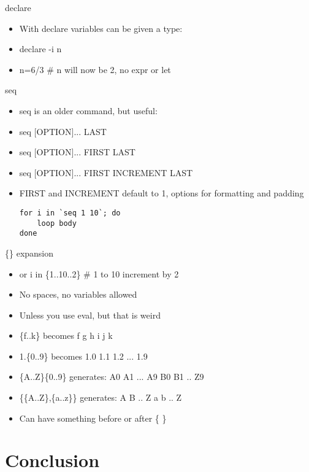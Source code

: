 \documentclass{beamer}
\begin{document}
\begin{frame}{declare}
\begin{itemize}
\item With declare variables can be given a type: \\
\item declare -i n \\
\item n=6/3 \# n will now be 2, no expr or let \\
\end{itemize}
\end{frame}

\begin{frame}[fragile]{seq}
\begin{itemize}
\item seq is an older command, but useful:
\item seq $[$OPTION$]$... LAST
\item seq $[$OPTION$]$... FIRST LAST
\item seq $[$OPTION$]$... FIRST INCREMENT LAST
\item FIRST and INCREMENT default to 1, options for formatting and padding
\begin{lstlisting}
for i in `seq 1 10`; do
    loop body
done
\end{lstlisting}
\end{itemize}
\end{frame}


\begin{frame}{\{\} expansion}
\begin{itemize}
\item or i in \{1..10..2\}  \# 1 to 10 increment by 2
\item No spaces, no variables allowed
\item Unless you use eval, but that is weird
\item \{f..k\}  becomes f g h i j k
\item 1.\{0..9\} becomes 1.0 1.1 1.2 ... 1.9
\item \{A..Z\}\{0..9\} generates: A0 A1 ... A9 B0 B1 .. Z9
\item \{\{A..Z\},\{a..z\}\} generates: A B .. Z a b .. Z
\item Can have something before or after \{ \}
\end{itemize}
\end{frame}

\section{Conclusion}
\end{document}
